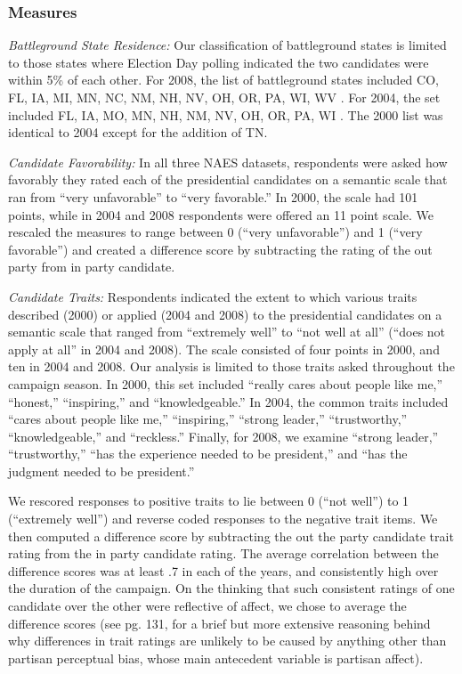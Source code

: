\documentclass[12pt, letterpaper]{article}
\begin{document}
\subsubsection*{Measures}
\textit{Battleground State Residence:} Our classification of battleground states is limited to those states where Election Day polling indicated the two candidates were within 5\% of each other. For 2008, the list of battleground states included CO, FL, IA, MI, MN, NC, NM, NH, NV, OH, OR, PA, WI, WV \citep[see][]{jackman2009}.  For 2004, the set included FL, IA, MO, MN, NH, NM, NV, OH, OR, PA, WI \citep[see][]{hillygus2005}. The 2000 list was identical to 2004 except for the addition of TN.

\textit{Candidate Favorability:} In all three NAES datasets, respondents were asked how favorably they rated each of the presidential candidates on a semantic scale that ran from ``very unfavorable'' to ``very favorable.'' In 2000, the scale had 101 points, while in 2004 and 2008 respondents were offered an 11 point scale. We rescaled the measures to range between 0 (``very unfavorable'') and 1 (``very favorable'') and created a difference score by subtracting the rating of the out party from in party candidate.

\textit{Candidate Traits:}  Respondents indicated the extent to which various traits described (2000) or applied (2004 and 2008) to the presidential candidates on a semantic scale that ranged from ``extremely well'' to ``not well at all'' (``does not apply at all'' in 2004 and 2008).  The scale consisted of four points in 2000, and ten in 2004 and 2008.  Our analysis is limited to those traits asked throughout the campaign season. In 2000, this set included ``really cares about people like me,'' ``honest,'' ``inspiring,'' and ``knowledgeable.''  In 2004, the common traits included ``cares about people like me,'' ``inspiring,'' ``strong leader,'' ``trustworthy,'' ``knowledgeable,'' and ``reckless.''  Finally, for 2008, we examine ``strong leader,'' ``trustworthy,'' ``has the experience needed to be president,'' and ``has the judgment needed to be president.''  

We rescored responses to positive traits to lie between 0 (``not well'') to 1 (``extremely well'') and reverse coded responses to the negative trait items.  We then computed a difference score by subtracting the out the party candidate trait rating from the in party candidate rating. The average correlation between the difference scores was at least .7 in each of the years, and consistently high over the duration of the campaign. On the thinking that such consistent ratings of one candidate over the other were reflective of affect, we chose to average the difference scores (see pg. 131, \citet{bartels2002} for a brief but more extensive reasoning behind why differences in trait ratings are unlikely to be caused by anything other than partisan perceptual bias, whose main antecedent variable is partisan affect).
\end{document}
